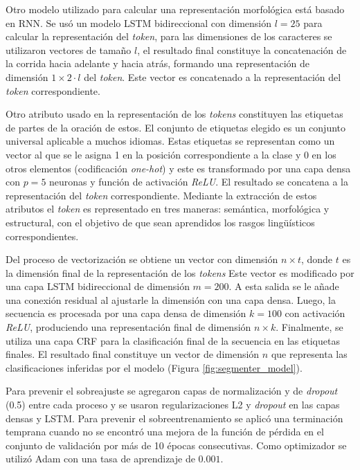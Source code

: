 \documentclass{rcci} %
\begin{document}
Otro modelo utilizado para calcular una representaci\'on morfol\'ogica est\'a basado en RNN. Se us\'o
un modelo LSTM bidireccional con dimensi\'on $l=25$ para calcular la representaci\'on del \textit{token}, para las dimensiones de los caracteres se
utilizaron vectores de tama\~no $l$, el resultado final constituye la concatenaci\'on de la corrida hacia adelante y
hacia atr\'as, formando una representaci\'on de dimensi\'on $1 \times 2 \cdot l$ del \textit{token}. Este vector es concatenado a la representaci\'on
del \textit{token} correspondiente. 

Otro atributo usado en la representaci\'on de los \textit{tokens} constituyen las etiquetas de 
partes de la oraci\'on de estos.
El conjunto de etiquetas elegido es un conjunto universal \citep{petrov2011universal} aplicable a muchos idiomas.
Estas etiquetas se representan como un vector al que se le asigna 1 en la posici\'on correspondiente a la clase y 0 en 
los otros elementos (codificaci\'on \textit{one-hot}) y este es transformado por una capa densa con $p=5$ neuronas
y funci\'on de activaci\'on \textit{ReLU}. El resultado se concatena a la representaci\'on del \textit{token} correspondiente. Mediante 
la extracci\'on de estos atributos el \textit{token} es representado en tres maneras: sem\'antica, morfol\'ogica y estructural, con el 
objetivo de que sean aprendidos los rasgos ling\"u\'isticos correspondientes.

Del proceso de vectorizaci\'on se obtiene un vector con dimensi\'on $n \times t$, donde $t$ es la dimensi\'on final de la representaci\'on
de los \textit{tokens}  Este vector es modificado por una capa LSTM bidireccional de dimensi\'on $m=200$. A esta salida se le 
a\~nade una conexi\'on residual al ajustarle la dimensi\'on con una capa densa. Luego, la secuencia es procesada por una 
capa densa de dimensi\'on $k=100$ con activaci\'on \textit{ReLU}, produciendo una representaci\'on final de dimensi\'on 
$n \times k$. Finalmente, se utiliza una capa CRF
para la clasificaci\'on final de la secuencia en las etiquetas finales. El resultado final constituye un vector
de dimensi\'on $n$ que representa las clasificaciones inferidas por el modelo (Figura \ref{fig:segmenter_model}).

Para prevenir el sobreajuste se agregaron capas de normalizaci\'on y de \textit{dropout} (0.5) entre cada proceso y se usaron regularizaciones
L2 y \textit{dropout} en las capas densas y LSTM. 
Para prevenir el sobreentrenamiento se aplic\'o una 
terminaci\'on temprana cuando no se encontr\'o una mejora de la funci\'on de p\'erdida en el conjunto de validaci\'on
por m\'as de 10 \'epocas consecutivas. Como optimizador se utiliz\'o Adam con una tasa de aprendizaje de $0.001$.
\end{document}
